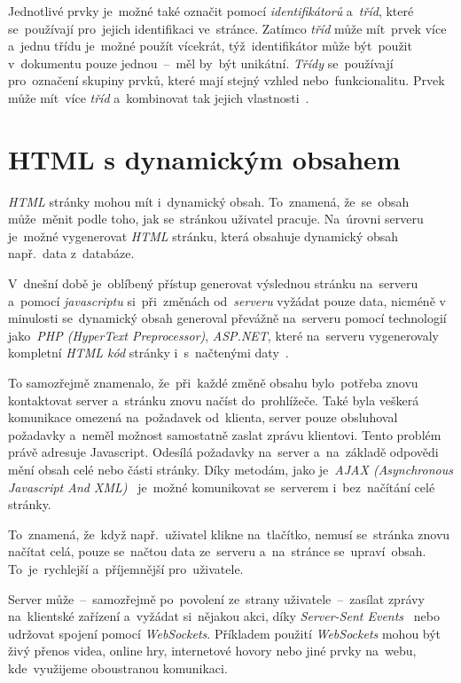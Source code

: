 \documentclass[11pt,a4paper]{report}
\begin{document}
            Jednotlivé prvky je~možné také označit pomocí \emph{identifikátorů} a~\emph{tříd}, které se~používají pro~jejich identifikaci ve~stránce. Zatímco \emph{tříd} může mít~prvek více a~jednu třídu je~možné použít vícekrát, týž~identifikátor může být~použit v~dokumentu pouze jednou~--~měl by~být unikátní. \emph{Třídy} se~používají pro~označení skupiny prvků, které mají stejný vzhled nebo~funkcionalitu. Prvek může mít~více \emph{tříd} a~kombinovat tak jejich vlastnosti~\cite{jpw:tridy}.

        \section{HTML s dynamickým obsahem}
            \emph{HTML} stránky mohou mít i~dynamický obsah. To~znamená, že~se~obsah může~měnit podle toho, jak se~stránkou uživatel pracuje. Na~úrovni serveru je~možné vygenerovat \emph{HTML} stránku, která obsahuje dynamický obsah např.~data z~databáze.
            
            V~dnešní době je~oblíbený přístup generovat výslednou stránku na~serveru a~pomocí \emph{javascriptu} si~při~změnách od~\emph{serveru} vyžádat pouze data, nicméně v minulosti se~dynamický obsah generoval převážně na~serveru pomocí technologií jako~\emph{PHP (HyperText Preprocessor)}, \emph{ASP.NET}, které na~serveru vygenerovaly kompletní \emph{HTML kód} stránky i~s~načtenými daty~\cite{kantor_javascript, uc:ssrandssg}.

            To samozřejmě znamenalo, že~při~každé změně obsahu bylo~potřeba znovu kontaktovat server a~stránku znovu načíst do~prohlížeče. Také byla veškerá komunikace omezená na~požadavek od~klienta, server pouze obsluhoval požadavky a~neměl možnost samostatně zaslat zprávu klientovi. Tento problém právě adresuje Javascript. Odesílá požadavky na~server a~na~základě odpovědi mění obsah celé nebo části stránky. Díky metodám, jako je~\emph{AJAX (Asynchronous Javascript And XML)}~\cite{ajax:mdn} je~možné komunikovat se~serverem i~bez~načítání celé stránky.

            To~znamená, že~když např.~uživatel klikne na~tlačítko, nemusí se~stránka znovu načítat celá, pouze se~načtou data ze~serveru a~na~stránce se~upraví~obsah. To~je~rychlejší a~příjemnější pro~uživatele.

            Server může~--~samozřejmě po~povolení ze~strany uživatele~--~zasílat zprávy na~klientské zařízení a~vyžádat si~nějakou akci, díky \emph{Server-Sent Events}~\cite{sse:mdn} nebo udržovat spojení pomocí \emph{WebSockets}. Příkladem použití \emph{WebSockets} mohou být živý přenos videa, online hry, internetové hovory nebo jiné prvky na~webu, kde~využijeme oboustranou komunikaci.~\cite{websocket:mdn}
\end{document}
